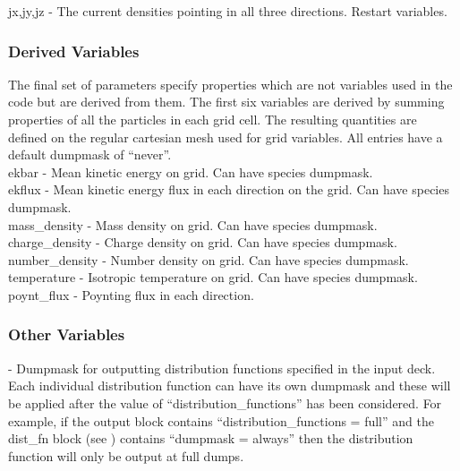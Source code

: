 {\emphtext jx,\;jy,\;jz} - The current densities pointing in all three
directions. Restart variables.\\

\subsubsection{Derived Variables}
The final set of parameters specify properties which are not variables used
in the code but are derived from them. The first six variables are derived
by summing properties of all the particles in each grid cell. The resulting
quantities are defined on the regular cartesian mesh used for grid variables.
All entries have a default dumpmask of ``never''.\\

{\emphtext ekbar} - Mean kinetic energy on grid. Can have species dumpmask.\\

{\emphtext ekflux} - Mean kinetic energy flux in each direction on the grid.
Can have species dumpmask.\\

{\emphtext mass\_density} - Mass density on grid. Can have species dumpmask.\\

{\emphtext charge\_density} - Charge density on grid. Can have species
dumpmask.\\

{\emphtext number\_density} - Number density on grid. Can have species
dumpmask.\\

{\emphtext temperature} - Isotropic temperature on grid. Can have species
dumpmask.\\

{\emphtext poynt\_flux} - Poynting flux in each direction.\\


\subsubsection{Other Variables}

\hspace*{\parindent}%
{} - Dumpmask for outputting distribution
functions specified in the input deck. Each individual distribution function
can have its own dumpmask and these will be applied after the value of
``distribution\_functions'' has been considered. For example, if the
output block contains ``distribution\_functions = full'' and the dist\_fn
block (see ) contains ``dumpmask = always'' then the
distribution function will only be output at full dumps.\\

